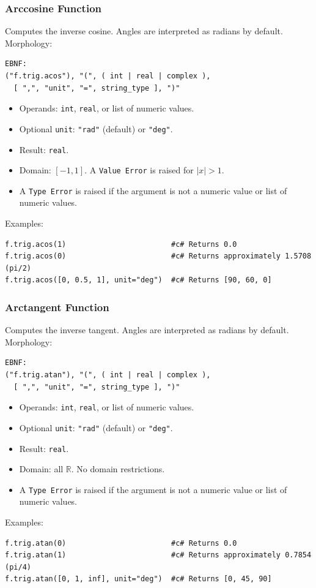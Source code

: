 \subsubsection{Arccosine Function}
Computes the inverse cosine. Angles are interpreted as radians by default. \\
Morphology:
\begin{verbatim}
EBNF:
("f.trig.acos"), "(", ( int | real | complex ), 
  [ ",", "unit", "=", string_type ], ")"
\end{verbatim}
\begin{itemize}
\item Operands: \texttt{int}, \texttt{real}, or list of numeric values.
\item Optional \texttt{unit}: \texttt{"rad"} (default) or \texttt{"deg"}.
\item Result: \texttt{real}.
\item Domain: $[-1, 1]$. A \texttt{Value Error} is raised for $|x| > 1$.
\item A \texttt{Type Error} is raised if the argument is not a numeric value or list of numeric values.
\end{itemize}
Examples:
\begin{verbatim}
f.trig.acos(1)                        #c# Returns 0.0
f.trig.acos(0)                        #c# Returns approximately 1.5708 (pi/2)
f.trig.acos([0, 0.5, 1], unit="deg")  #c# Returns [90, 60, 0]
\end{verbatim}

\subsubsection{Arctangent Function}
Computes the inverse tangent. Angles are interpreted as radians by default. \\
Morphology:
\begin{verbatim}
EBNF:
("f.trig.atan"), "(", ( int | real | complex ), 
  [ ",", "unit", "=", string_type ], ")"
\end{verbatim}
\begin{itemize}
\item Operands: \texttt{int}, \texttt{real}, or list of numeric values.
\item Optional \texttt{unit}: \texttt{"rad"} (default) or \texttt{"deg"}.
\item Result: \texttt{real}.
\item Domain: all $\mathbb{R}$. No domain restrictions.
\item A \texttt{Type Error} is raised if the argument is not a numeric value or list of numeric values.
\end{itemize}
Examples:
\begin{verbatim}
f.trig.atan(0)                        #c# Returns 0.0
f.trig.atan(1)                        #c# Returns approximately 0.7854 (pi/4)
f.trig.atan([0, 1, inf], unit="deg")  #c# Returns [0, 45, 90]
\end{verbatim}

